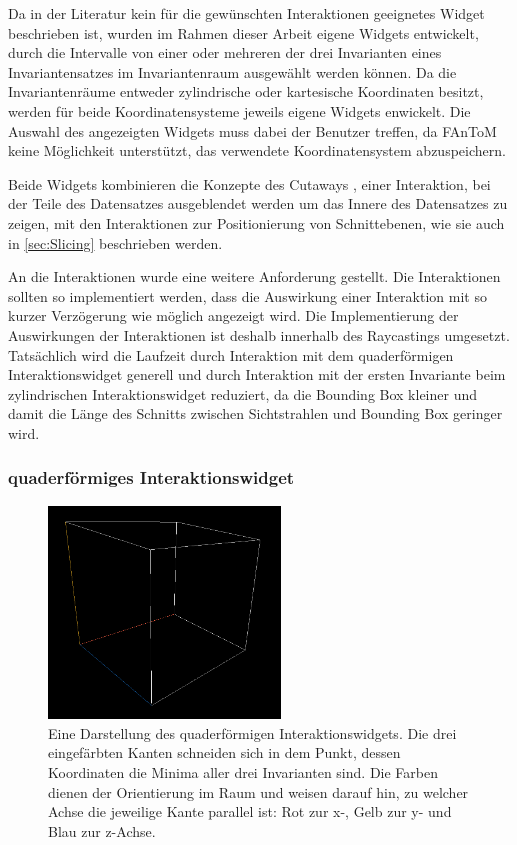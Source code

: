 \documentclass[a4paper,fontsize=12pt,toc=bib,parskip=half,ngerman]{scrartcl}
\begin{document}
Da in der Literatur kein f\"ur die gew\"unschten Interaktionen geeignetes Widget beschrieben ist, wurden im Rahmen dieser Arbeit eigene Widgets entwickelt, durch die Intervalle von einer oder mehreren der drei Invarianten eines Invariantensatzes im Invariantenraum ausgew\"ahlt werden k\"onnen. Da die Invariantenr\"aume entweder zylindrische oder kartesische Koordinaten besitzt, werden f\"ur beide Koordinatensysteme jeweils eigene Widgets enwickelt. Die Auswahl des angezeigten Widgets muss dabei der Benutzer treffen, da FAnToM keine M\"oglichkeit unterst\"utzt, das verwendete Koordinatensystem abzuspeichern.

Beide Widgets kombinieren die Konzepte des Cutaways \cite[S.~406~f.]{preim2015interaktive}, einer Interaktion, bei der Teile des Datensatzes ausgeblendet werden um das Innere des Datensatzes zu zeigen, mit den Interaktionen zur Positionierung von Schnittebenen, wie sie auch in \cref{sec:Slicing} beschrieben werden. 

An die Interaktionen wurde eine weitere Anforderung gestellt. Die Interaktionen sollten so implementiert werden, dass die Auswirkung einer Interaktion mit so kurzer Verz\"ogerung wie m\"oglich angezeigt wird. Die Implementierung der Auswirkungen der Interaktionen ist deshalb innerhalb des Raycastings umgesetzt. Tats\"achlich wird die Laufzeit durch Interaktion mit dem quaderf\"ormigen Interaktionswidget generell und durch Interaktion mit der ersten Invariante beim zylindrischen Interaktionswidget reduziert, da die Bounding Box kleiner und damit die L\"ange des Schnitts zwischen Sichtstrahlen und Bounding Box geringer wird.

\subsubsection{quaderf\"ormiges Interaktionswidget}

\begin{figure}
	\centering
	\includegraphics[width=0.55\textwidth]{pictures/QuadricInteractions.png}
	\caption{Eine Darstellung des quaderf\"ormigen Interaktionswidgets. Die drei eingef\"arbten Kanten schneiden sich in dem Punkt, dessen Koordinaten die Minima aller drei Invarianten sind. Die Farben dienen der Orientierung im Raum und weisen darauf hin, zu welcher Achse die jeweilige Kante parallel ist: Rot zur x-, Gelb zur y- und Blau zur z-Achse.}
	\label{CubicalInteractions}
\end{figure}
\end{document}
